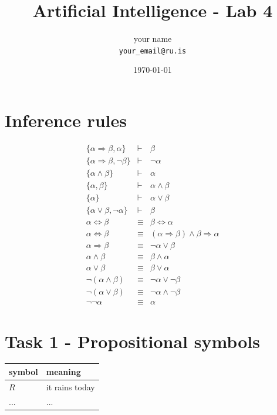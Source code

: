 \documentclass[10pt]{article}
\title{Artificial Intelligence - Lab 4}
\author{your name\\
\small \texttt{your\_email@ru.is}
}
\date{\today}
\newcommand{\infers}{\vdash}
\renewcommand{\implies}{\Rightarrow}
\begin{document}
\maketitle

\section*{Inference rules}
\begin{eqnarray}
\{ \alpha \implies \beta, \alpha \} & \infers & \beta\\
\{ \alpha \implies \beta, \neg \beta \} & \infers & \neg \alpha\\
\{ \alpha \land \beta \} & \infers & \alpha\\
\{ \alpha , \beta \} & \infers & \alpha \land \beta\\
\{ \alpha \} & \infers & \alpha \lor \beta\\
\{ \alpha \lor \beta, \neg \alpha \} & \infers & \beta\\
 \alpha \Leftrightarrow \beta & \equiv & \beta \Leftrightarrow \alpha\\
 \alpha \Leftrightarrow \beta & \equiv & (\alpha \implies \beta) \land \beta \implies \alpha\\
 \alpha \implies \beta & \equiv & \neg \alpha \lor \beta\\
 \alpha \land \beta & \equiv & \beta \land \alpha\\
 \alpha \lor \beta & \equiv & \beta \lor \alpha\\
 \neg (\alpha \land \beta) & \equiv & \neg \alpha \lor \neg \beta\\
 \neg (\alpha \lor \beta) & \equiv & \neg \alpha \land \neg \beta\\
 \neg \neg \alpha & \equiv & \alpha
\end{eqnarray}

\section*{Task 1 - Propositional symbols}
\begin{tabular}{l|l}
symbol & meaning \\
\hline
$R$ & it rains today \\
... & ... \\

\end{tabular} 
\end{document}
